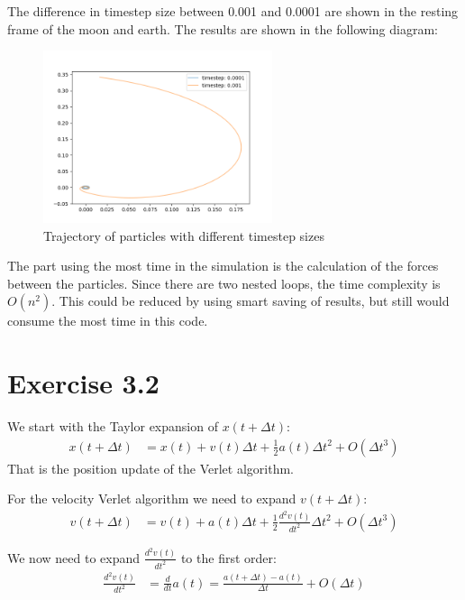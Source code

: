 \documentclass[a4paper,11pt,bibtotoc]{scrartcl}
\begin{document}
The difference in timestep size between 0.001 and 0.0001 are shown in the resting frame of the moon and earth. The results are shown in the following diagram:
\begin{figure}[!htbp]
	\centering
	\includegraphics[width=0.6\textwidth]{ex_3_1_2.png}
	\caption{Trajectory of particles with different timestep sizes}
	\label{fig:ex_3_1_2}
\end{figure}


The part using the most time in the simulation is the calculation of the forces between the particles. Since there are two nested loops, the time complexity is $O(n^2)$.
This could be reduced by using smart saving of results, but still would consume the most time in this code.

\section{Exercise 3.2}

We start with the Taylor expansion of $x(t + \Delta t)$:
\begin{align}
	x(t + \Delta t) &= x(t) + v(t) \Delta t + \frac{1}{2} a(t) \Delta t^2 + O(\Delta t^3)
\end{align}
That is the position update of the Verlet algorithm.

For the velocity Verlet algorithm we need to expand $v(t + \Delta t)$:
\begin{align}
	v(t + \Delta t) &= v(t) + a(t) \Delta t + \frac{1}{2} \frac{d^2 v(t)}{dt^2} \Delta t^2 + O(\Delta t^3)
\end{align}

We now need to expand $\frac{d^2 v(t)}{dt^2}$ to the first order:
\begin{align}
	\frac{d^2 v(t)}{dt^2} &= \frac{d}{dt} a(t) = \frac{a(t + \Delta t) - a(t)}{\Delta t} + O(\Delta t)
\end{align}
\end{document}
